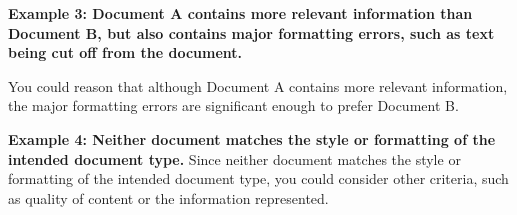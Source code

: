 \textbf{Example 3: Document A contains more relevant information than Document B, but also contains major formatting errors, such as text being cut off from the document.}

You could reason that although Document A contains more relevant information, the major formatting errors are significant enough to prefer Document B.

\textbf{Example 4: Neither document matches the style or formatting of the intended document type. 
}
Since neither document matches the style or formatting of the intended document type, you could consider other criteria, such as quality of content or the information represented. 


